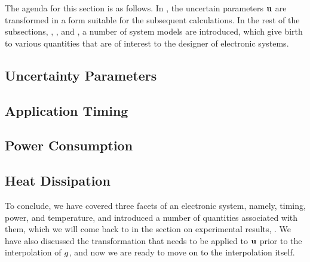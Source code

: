 The agenda for this section is as follows. In , the uncertain
parameters $\mathbf{u}$ are transformed in a form suitable for the subsequent
calculations. In the rest of the subsections, , , and
, a number of system models are introduced, which give birth
to various quantities that are of interest to the designer of electronic
systems.

\subsection{Uncertainty Parameters} 


\subsection{Application Timing} 


\subsection{Power Consumption} 


\subsection{Heat Dissipation} 


To conclude, we have covered three facets of an electronic system, namely,
timing, power, and temperature, and introduced a number of quantities associated
with them, which we will come back to in the section on experimental results,
. We have also discussed the transformation that needs to
be applied to $\mathbf{u}$ prior to the interpolation of $g$, and now we are ready to
move on to the interpolation itself.
